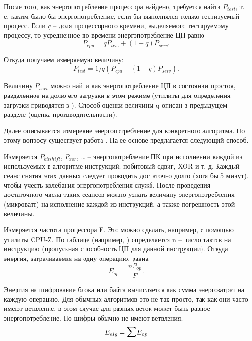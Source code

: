 После того, как энергопотребление процессора найдено, требуется найти $P_{test}$, т. е. каким было бы энергопотребление, если бы выполнялся только тестируемый процесс. Если $q$ – доля процессорного времени, выделяемого тестируемому процессу, то усредненное по времени энергопотребление ЦП равно
\begin{equation}
P_{cpu} = q P_{test} + (1 - q)P_{serv}.
\end{equation}

Откуда получаем измеряемую величину:
\begin{equation}
P_{test} = 1/q ( P_{cpu} - (1 - q) P_{serv}).
\end{equation}

Величину $P_{serv}$ можно найти как энергопотребление ЦП в состоянии простоя, разделенное на долю его загрузки в этом режиме (утилиты для определения загрузки приводятся в \cite{src69} ). Способ оценки величины q описан в предыдущем разделе (оценка производительности).

Далее описывается измерение энергопотребление для конкретного алгоритма. По этому вопросу существует работа \cite{src71}. На ее основе предлагается следующий способ.

Измеряется $P_{bitshift}$, $P_{xor}$, … -- энергопотребление ПК при исполнении каждой из используемых в алгоритме инструкций: побитовый сдвиг, XOR и т. д. Каждый сеанс снятия этих данных следует проводить достаточно долго (хотя бы 5 минут), чтобы учесть колебания энергопотребления служб. После проведения достаточного числа таких сеансов можно узнать величину энергопотребления (микроватт) на исполнение каждой из инструкций, а также погрешность этой величины.

Измеряется частота процессора F. Это можно сделать, например, с помощью утилиты CPU-Z. По таблице (например, \cite{src60}) определяется n – число тактов на инструкцию (пропускная способность ЦП для данной инструкции). Откуда энергия, затрачиваемая на одну операцию, равна
\begin{equation}
E_{op} = \frac{ nP_{op} }{ F }.
\end{equation}

Энергия на шифрование блока или байта вычисляется как сумма энергозатрат на каждую операцию. Для обычных алгоритмов это не так просто, так как они часто имеют ветвление, в этом случае для разных веток может быть разное энергопотребление. Но шифры обычно не имеют ветвления.
\begin{equation}
E_{alg} = \mathlarger{\mathlarger{\sum}}E_{op}
\end{equation}

